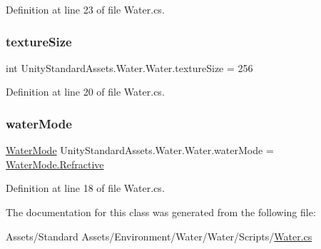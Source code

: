 Definition at line 23 of file Water.\+cs.

\mbox{\label{class_unity_standard_assets_1_1_water_1_1_water_ad71f94b850d1446efe7e07daa8d4f23f}} 
\subsubsection{\texorpdfstring{texture\+Size}{textureSize}}
{\footnotesize\ttfamily int Unity\+Standard\+Assets.\+Water.\+Water.\+texture\+Size = 256}



Definition at line 20 of file Water.\+cs.

\mbox{\label{class_unity_standard_assets_1_1_water_1_1_water_a88a2cf28e2e546607d17e7be84a6e046}} 
\subsubsection{\texorpdfstring{water\+Mode}{waterMode}}
{\footnotesize\ttfamily \mbox{\hyperlink{class_unity_standard_assets_1_1_water_1_1_water_a9e5d3bf13fa82b48b85d9f90f707379e}{Water\+Mode}} Unity\+Standard\+Assets.\+Water.\+Water.\+water\+Mode = \mbox{\hyperlink{class_unity_standard_assets_1_1_water_1_1_water_a9e5d3bf13fa82b48b85d9f90f707379eadced932db1d01033f77c380f76362e2f}{Water\+Mode.\+Refractive}}}



Definition at line 18 of file Water.\+cs.



The documentation for this class was generated from the following file\+:\begin{DoxyCompactItemize}
\item 
Assets/\+Standard Assets/\+Environment/\+Water/\+Water/\+Scripts/\mbox{\hyperlink{_water_8cs}{Water.\+cs}}\end{DoxyCompactItemize}
